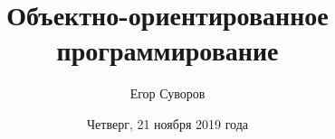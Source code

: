 \documentclass[utf8,xcolor=table]{beamer}
\title[ООП]{Объектно-ориентированное программирование}
\author{Егор Суворов}
\institute[НИУ ВШЭ]{Курс <<Основы программирования>>}
\date[21.11.2019]{Четверг, 21 ноября 2019 года}
\begin{document}
\begin{frame}
\titlepage
\end{frame}



\end{document}
